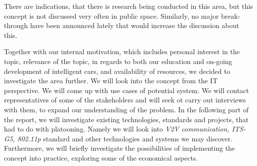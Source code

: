 There are indications, that there is research being conducted in this area, but this concept is not discussed very often in public space. Similarly, no major break-through have been announced lately that would increase the discussion about this.\par

Together with our internal motivation, which includes personal interest in the topic, relevance of the topic, in regards to both our education and on-going development of intelligent cars, and availability of resources, we decided to investigate the area further. We will look into the concept from the IT perspective. We will come up with use cases of potential system. We will contact representatives of some of the stakeholders and will seek ot carry out interviews with them, to expand our understanding of the problem. In the following part of the report, we will investigate existing technologies, standards and projects, that had to do with platooning. Namely we will look into \emph{V2V communication, ITS-G5, 802.11p} standard and other technologies and systems we may discover. Furthermore, we will briefly investigate the possibilities of implementing the concept into practice, exploring some of the economical aspects.



